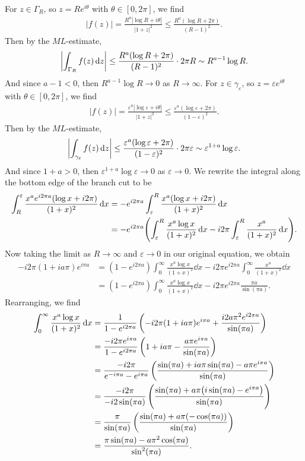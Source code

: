 \documentclass[12pt]{article}
\theoremstyle{definition}
\newcommand{\eps}{\varepsilon}
\newcommand{\pfrac}[2]{\left(\frac{#1}{#2}\right)}
\begin{document}
For $z \in \Gamma_R$, so $z = Re^{i\theta}$ with $\theta \in [0, 2\pi]$, we find
\begin{align*}
    |f(z)|
        = \frac{R^a|\log R + i\theta|}{|1 + z|^2}
        \leq \frac{R^a(\log R + 2\pi)}{(R - 1)^2}.
\end{align*}
Then by the $ML$-estimate,
\[
    \qty|\int_{\Gamma_R} f(z) \dd{z}|
        \leq \frac{R^a(\log R + 2\pi)}{(R - 1)^2} \cdot 2\pi R
        \sim R^{a - 1}\log R.
\]
And since $a - 1 < 0$, then $R^{a-1}\log R \to 0$ as $R \to \infty$. For $z \in \gamma_\eps$, so $z = \eps e^{i\theta}$ with $\theta \in [0, 2\pi]$, we find
\begin{align*}
    |f(z)|
        = \frac{\eps^a|\log \eps + i\theta|}{|1 + z|^2}
        \leq \frac{\eps^a(\log \eps + 2\pi)}{(1 - \eps)^2}.
\end{align*}
Then by the $ML$-estimate,
\[
    \qty|\int_{\gamma_\eps} f(z) \dd{z}|
        \leq \frac{\eps^a(\log\eps + 2\pi)}{(1 - \eps)^2} \cdot 2\pi \eps
        \sim \eps^{1+a} \log\eps.
\]
And since $1 + a > 0$, then $\eps^{1+a}\log\eps \to 0$ as $\eps \to 0$. We rewrite the integral along the bottom edge of the branch cut to be
\begin{align*}
    \int_{R}^{\eps} \frac{x^ae^{i2\pi a}(\log x + i2\pi)}{(1 + x)^2} \dd{x}
        &= -e^{i2\pi a} \int_{\eps}^{R} \frac{x^a(\log x + i2\pi)}{(1 + x)^2} \dd{x} \\
        &= -e^{i2\pi a} \qty(\int_{\eps}^{R} \frac{x^a\log x}{(1 + x)^2} \dd{x} - i2\pi \int_{\eps}^{R} \frac{x^a}{(1 + x)^2} \dd{x}).
\end{align*}
Now taking the limit as $R \to \infty$ and $\eps \to 0$ in our original equation, we obtain
\begin{align*}
    -i2\pi (1 + ia\pi) e^{i\pi a}
        &= (1 - e^{i2\pi a}) \int_{0}^{\infty} \frac{x^a\log x}{(1 + x)^2} \dd{x} - i2\pi  e^{i2\pi a} \int_{0}^{\infty} \frac{x^a}{(1 + x)^2} \dd{x} \\
        &= (1 - e^{i2\pi a}) \int_{0}^{\infty} \frac{x^a\log x}{(1 + x)^2} \dd{x} - i2\pi  e^{i2\pi a} \frac{\pi a}{\sin(\pi a)}.
\end{align*}
Rearranging, we find
\begin{align*}
    \int_{0}^{\infty} \frac{x^a\log x}{(1 + x)^2} \dd{x}
        &= \frac{1}{1 - e^{i2\pi a}} \left(-i2\pi (1 + ia\pi) e^{i\pi a} + \frac{i2a\pi^2 e^{i2\pi a}}{\sin(\pi a)}\right) \\
        &= \frac{-i2\pi e^{i\pi a}}{1 - e^{i2\pi a}} \left(1 + ia\pi - \frac{a\pi e^{i\pi a}}{\sin(\pi a)}\right) \\
        &= \frac{-i2\pi}{e^{-i\pi a} - e^{i\pi a}} \pfrac{\sin(\pi a) + ia\pi\sin(\pi a) - a\pi e^{i\pi a}}{\sin(\pi a)} \\
        &= \frac{-i2\pi}{-i2\sin(\pi a)} \pfrac{\sin(\pi a) + a\pi\qty(i\sin(\pi a) - e^{i\pi a})}{\sin(\pi a)} \\
        &= \frac{\pi}{\sin(\pi a)} \pfrac{\sin(\pi a) + a\pi(-\cos(\pi a))}{\sin(\pi a)} \\
        &= \frac{\pi\sin(\pi a) - a\pi^2\cos(\pi a)}{\sin^2(\pi a)}.
\end{align*}
\end{document}
